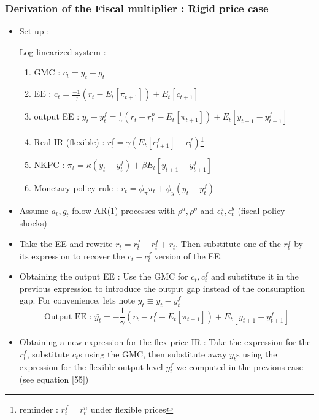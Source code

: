 \documentclass{article}
\begin{document}
\subsubsection{Derivation of the Fiscal multiplier : Rigid price case}
\begin{itemize}
    \item Set-up : 
    \begin{RecapBox}
        Log-linearized system : 
        \begin{enumerate}
            \item GMC : $c_t = y_t -g_t$
            \item EE : $c_t = \frac{-1}{\gamma}(r_t-E_t[\pi_{t+1}]) + E_t[c_{t+1}]$
            \item output EE : $y_t-y_t^f = \frac{1}{\gamma}(r_t-r_t^n-E_t[\pi_{t+1}]) + E_t[y_{t+1}-y_{t+1}^f]$
            \item Real IR (flexible) : $r_t^f = \gamma(E_t[c_{t+1}^f]-c_t^f)$\footnote{reminder : $r_t^f = r_t^n$ under flexible prices} 
            \item NKPC : $\pi_t = \kappa(y_t-y_t^f) + \beta E_t[y_{t+1}-y_{t+1}^f]$
            \item Monetary policy rule : $r_t = \phi_\pi\pi_t + \phi_y(y_t-y_t^f)$
        \end{enumerate}
    \end{RecapBox}
    \item Assume $a_t,g_t$ folow AR(1) processes with $\rho^a,\rho^g$ and $\epsilon_t^a, \epsilon_t^g$ (fiscal policy shocks)
    \item Take the EE and rewrite $r_t = r_t^f-r_t^f+r_t$. Then substitute one of the $r_t^f$ by its expression to recover the $c_t-c_t^f$ version of the EE. 
    \item Obtaining the output EE : Use the GMC for $c_t,c_t^f$ and substitute it in the previous expression to introduce the output gap instead of the consumption gap. For convenience, lets note $\bar{y}_t \equiv y_t-y_t^f$
    \begin{equation}
        \text{Output EE : }\bar{y_t} = -\frac{1}{\gamma} (r_t-r_t^f - E_t[\pi_{t+1}]) + E_t[y_{t+1}-y_{t+1}^f]
    \end{equation}
    \item Obtaining a new expression for the flex-price IR : Take the expression for the $r_t^f$, substitute $c_t$s using the GMC, then substitute away $y_t$s using the expression for the flexible output level $y_t^f$ we computed in the previous case (see equation [55])
    \begin{equation}

\end{equation}
\end{itemize}
\end{document}
